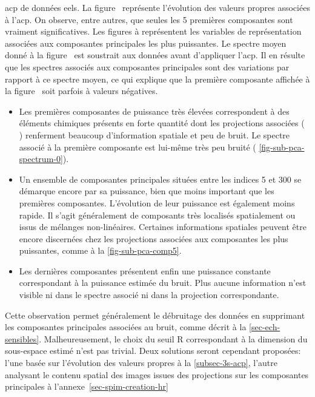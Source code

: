 \begin{normalfigure*}[htbp]
{            \label{fig-sub-pca-spectrum-0}}
        \caption{\gls{acp} de données \gls{eels}. La figure~ représente l'évolution des valeurs propres associées à l'\gls{acp}. On observe, entre autres, que seules les 5 premières composantes sont vraiment significatives. Les figures  à  représentent les variables de représentation associées aux composantes principales les plus puissantes. Le spectre moyen donné à la figure~ est soustrait aux données avant d'appliquer l'\gls{acp}. Il en résulte que les spectres associés aux composantes principales sont des variations par rapport à ce spectre moyen, ce qui explique que la première composante affichée à la figure~ soit parfois à valeurs négatives.
            \protect\label{fig-ACP}}
    \end{normalfigure*}    
    \begin{itemize}
        \item Les premières composantes de puissance très élevées correspondent à des éléments chimiques présents en forte quantité dont les projections associées (\cf{} ) renferment beaucoup d'information spatiale et peu de bruit. Le spectre associé à la première composante est lui-même très peu bruité (\cf{} \cref{fig-sub-pca-spectrum-0}).
        \item Un ensemble de composantes principales situées entre les indices 5 et 300 se démarque encore par sa puissance, bien que moins important que les premières composantes. L'évolution de leur puissance est également moins rapide. Il s'agit généralement de composants très localisés spatialement ou issus de mélanges non-linéaires. Certaines informations spatiales peuvent être encore discernées chez les projections associées aux composantes les plus puissantes, comme à la \cref{fig-sub-pca-comp5}.
        \item Les dernières composantes présentent enfin une puissance constante correspondant à la puissance estimée du bruit. Plus aucune information n'est visible ni dans le spectre associé ni dans la projection correspondante.
    \end{itemize}
    Cette observation permet généralement le débruitage des données en supprimant les composantes principales associées au bruit, comme décrit à la \cref{sec-ech-sensibles}. Malheureusement, le choix du seuil \gls{R} correspondant à la dimension du sous-espace estimé n'est pas trivial. Deux solutions seront cependant proposées: l'une basée sur l'évolution des valeurs propres à la \cref{subsec-3s-acp}, l'autre analysant le contenu spatial des images issues des projections sur les composantes principales à l'annexe~\ref{sec-spim-creation-hr}

